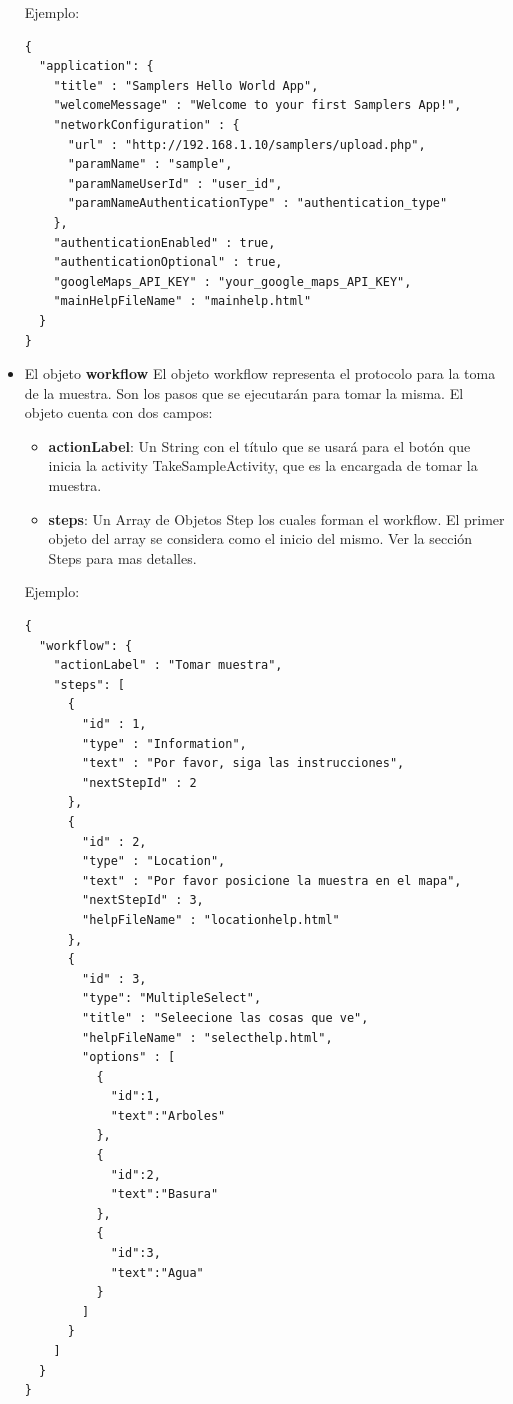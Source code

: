 \begin{itemize}
\begin{itemize}
	\end{itemize}
	
	
Ejemplo:
\begin{lstlisting}[language=XML, frame=tlb]
{
  "application": {
    "title" : "Samplers Hello World App",
    "welcomeMessage" : "Welcome to your first Samplers App!",
    "networkConfiguration" : {
      "url" : "http://192.168.1.10/samplers/upload.php",
      "paramName" : "sample",
      "paramNameUserId" : "user_id",
      "paramNameAuthenticationType" : "authentication_type"
    },
    "authenticationEnabled" : true,
    "authenticationOptional" : true,
    "googleMaps_API_KEY" : "your_google_maps_API_KEY",
    "mainHelpFileName" : "mainhelp.html"
  } 
}
\end{lstlisting}	
	
	
	\item El objeto \textbf{workflow}
	El objeto workflow representa el protocolo para la toma de la muestra. Son los pasos que se ejecutarán para tomar la misma.
	El objeto cuenta con dos campos:
		
	\begin{itemize}
	
		\item \textbf{actionLabel}: Un String con el título que se usará para el botón que inicia la activity TakeSampleActivity, que es la encargada de tomar la muestra.
		
		\item \textbf{steps}: Un Array de Objetos Step los cuales forman el workflow. El primer objeto del array se considera como el inicio del mismo. Ver la sección Steps para mas detalles.
	
	
	\end{itemize}	
	
	
Ejemplo:
\begin{lstlisting}[language=XML, frame=tlb]	
{
  "workflow": {
    "actionLabel" : "Tomar muestra",
    "steps": [
      {
        "id" : 1,
        "type" : "Information",
        "text" : "Por favor, siga las instrucciones",
        "nextStepId" : 2
      },
      {
        "id" : 2,
        "type" : "Location",
        "text" : "Por favor posicione la muestra en el mapa",
        "nextStepId" : 3,
        "helpFileName" : "locationhelp.html"
      },
      {
        "id" : 3,
        "type": "MultipleSelect",
        "title" : "Seleecione las cosas que ve",
        "helpFileName" : "selecthelp.html",
        "options" : [
          {
            "id":1,
            "text":"Arboles"
          },
          {
            "id":2,
            "text":"Basura"
          },
          {
            "id":3,
            "text":"Agua"
          }
        ]
      }
    ]
  }
}

\end{lstlisting}	
	
\end{itemize}

